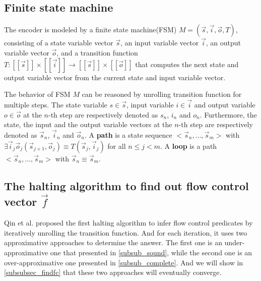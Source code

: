 \documentclass[runningheads,a4paper,orivec]{llncs}
\begin{document}
\subsection{Finite state machine}\label{subsec_fsm}



The encoder is modeled by a finite state machine(FSM) $M=(\vec{s},\vec{i},\vec{o},T)$,
consisting of a state variable vector $\vec{s}$,
an input variable vector $\vec{i}$,
an output variable vector $\vec{o}$,
and a transition function $T: [\![\vec{s}]\!]\times [\![\vec{i}]\!]\to [\![\vec{s}]\!]\times [\![\vec{o}]\!]$ 
that computes the next state and output variable vector from the current state and input variable vector.

The behavior of FSM $M$ can be reasoned by unrolling transition function for multiple steps.
The state variable $s\in\vec{s}$, input variable $i\in\vec{i}$ and output variable $o\in\vec{o}$ at the $n$-th step 
are respectively denoted as $s_n$, $i_n$ and $o_n$.
Furthermore,
the state, the input and the output variable vectors at the $n$-th step are respectively denoted as $\vec{s}_n$, $\vec{i}_n$ and $\vec{o}_n$.
A \textbf{path} is a state sequence $<\vec{s}_n,\dots,\vec{s}_m>$ with $\exists \vec{i}_j\vec{o}_j (\vec{s}_{j+1},\vec{o}_j)\equiv T(\vec{s}_j,\vec{i}_j)$ for all $n\le j< m$.
A \textbf{loop} is a path $<\vec{s}_n,\dots,\vec{s}_m>$ with $\vec{s}_n\equiv \vec{s}_m$.



\subsection{The halting algorithm to find out flow control vector $\vec{f}$}\label{subsec_chkextdec}


Qin et al. \cite{QinTODAES15} proposed the first halting algorithm
to infer flow control predicates by iteratively unrolling the transition function.
And for each iteration,
it uses two approximative approaches to determine the answer.
The first one is an under-approximative one that presented in \ref{subsub_sound},
while the second one is an over-approximative one presented in \ref{subsub_complete}.
And we will show in \ref{subsubsec_findfc} that these two approaches will eventually converge.
\end{document}
